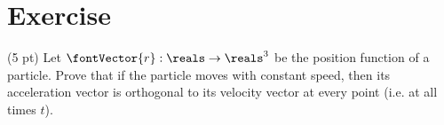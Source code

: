 \section{Exercise}

(5 pt) Let $\fontVector{r}: \reals \rightarrow \reals^{3}$ be the position function of a particle. Prove that if the particle moves with constant speed, then its acceleration vector is orthogonal to its velocity vector at every point (i.e. at all times $t$). 